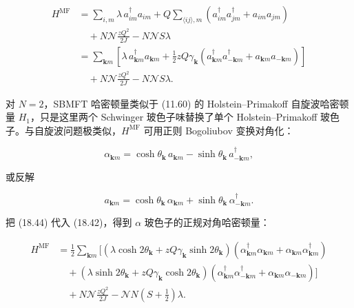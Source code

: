 \begin{align*}
H ^ {\mathrm{MF}} & = \sum_{i, m} \lambda \, a _ {im} ^ {\dagger} a _ {im} + Q \sum_{\langle ij \rangle, m} \left( a _ {im} ^ {\dagger} a _ {jm} ^ {\dagger} + a _ {im} a _ {jm} \right)\\
& \quad + N \mathcal {N} \frac {z Q ^ {2}}{2 J} - N \mathcal {N} S \lambda\\
& = \sum_{\mathbf {k} m} \left[ \lambda \, a _ {\mathbf {k} m} ^ {\dagger} a _ {\mathbf {k} m} + \frac {1}{2} z Q \gamma_ {\mathbf {k}} \left( a _ {\mathbf {k} m} ^ {\dagger} a _ {- \mathbf {k} m} ^ {\dagger} + a _ {\mathbf {k} m} a _ {- \mathbf {k} m} \right) \right]\\
& \quad + N \mathcal {N} \frac {z Q ^ {2}}{2 J} - N \mathcal {N} S \lambda .
\tag{18.42}
\end{align*}

对 $N = 2$，SBMFT 哈密顿量类似于 (11.60) 的 Holstein--Primakoff 自旋波哈密顿量 $H_{1}$，只是这里两个 Schwinger 玻色子味替换了单个 Holstein--Primakoff 玻色子。与自旋波问题极类似，$H^{\mathrm{MF}}$ 可用正则 Bogoliubov 变换对角化：

\begin{equation*}
\alpha_ {\mathbf {k} m} = \cosh \theta_ {\mathbf {k}} \, a _ {\mathbf {k} m} - \sinh \theta_ {\mathbf {k}} \, a _ {- \mathbf {k} m} ^ {\dagger} ,
\tag{18.43}
\end{equation*}

或反解

\begin{equation*}
a _ {\mathbf {k} m} = \cosh \theta_ {\mathbf {k}} \, \alpha_ {\mathbf {k} m} + \sinh \theta_ {\mathbf {k}} \, \alpha_{- \mathbf {k} m} ^ {\dagger}.
\tag{18.44}
\end{equation*}

把 (18.44) 代入 (18.42)，得到 $\alpha$ 玻色子的正规对角哈密顿量：

\begin{align*}
H ^ {\mathrm{MF}} & = \frac {1}{2} \sum_{\mathbf {k} m} \Big[ \left( \lambda \cosh 2 \theta_ {\mathbf {k}} + z Q \gamma_ {\mathbf {k}} \sinh 2 \theta_ {\mathbf {k}} \right) \left( \alpha_{\mathbf {k} m} ^ {\dagger} \alpha_{\mathbf {k} m} + \alpha_{\mathbf {k} m} \alpha_{\mathbf {k} m} ^ {\dagger} \right)\\
& \quad + \left( \lambda \sinh 2 \theta_ {\mathbf {k}} + z Q \gamma_ {\mathbf {k}} \cosh 2 \theta_ {\mathbf {k}} \right) \left( \alpha_{\mathbf {k} m} ^ {\dagger} \alpha_{- \mathbf {k} m} ^ {\dagger} + \alpha_{\mathbf {k} m} \alpha_{- \mathbf {k} m} \right) \Big]\\
& \quad + N \mathcal {N} \frac {z Q ^ {2}}{2 J} - \mathcal {N} N \left( S + \frac {1}{2} \right) \lambda .
\tag{18.45}
\end{align*}

